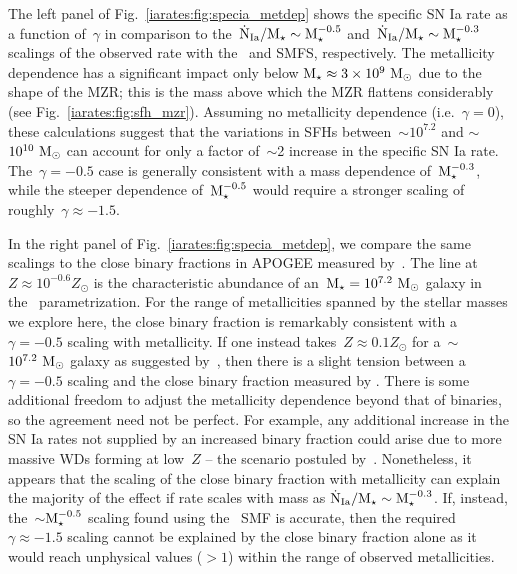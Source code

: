 The left panel of Fig.~\ref{iarates:fig:specia_metdep} shows the specific SN Ia rate
as a function of~$\gamma$ in comparison to the~$\dot{\text{N}}_\text{Ia} /
\text{M}_\star \sim \text{M}_\star^{-0.5}$ and~$\dot{\text{N}}_\text{Ia} / \text{M}_\star \sim
\text{M}_\star^{-0.3}$ scalings of the observed rate with the~\citet{Bell2003} and
\citet{Baldry2012} SMFS, respectively.
The metallicity dependence has a significant impact only below
$\text{M}_\star \approx 3\times10^9~\text{M}_\odot$ due to the shape of the MZR;
this is the mass above which the MZR flattens considerably (see
Fig.~\ref{iarates:fig:sfh_mzr}).
Assuming no metallicity dependence (i.e.~$\gamma = 0$), these calculations
suggest that the variations in SFHs between~$\sim$$10^{7.2}$ and
$\sim$$10^{10}~\text{M}_\odot$ can account for only a factor of~$\sim$2 increase in the
specific SN Ia rate.
The~$\gamma = -0.5$ case is generally consistent with a mass dependence
of~$\text{M}_\star^{-0.3}$, while the steeper dependence of~$\text{M}_\star^{-0.5}$ would
require a stronger scaling of roughly~$\gamma \approx -1.5$.
\par
In the right panel of Fig.~\ref{iarates:fig:specia_metdep}, we compare the same
scalings to the close binary fractions in APOGEE measured by~\citet{Moe2019}.
The line at~$Z \approx 10^{-0.6} Z_\odot$ is the characteristic abundance of
an~$\text{M}_\star = 10^{7.2}~\text{M}_\odot$ galaxy in the~\citet{Zahid2014} parametrization.
For the range of metallicities spanned by the stellar masses we explore here,
the close binary fraction is remarkably consistent with a~$\gamma = -0.5$
scaling with metallicity.
If one instead takes~$Z \approx 0.1Z_\odot$ for a~$\sim$$10^{7.2}~\text{M}_\odot$ galaxy
as suggested by~\citet{Andrews2013}, then there is a slight tension between a
$\gamma = -0.5$ scaling and the close binary fraction measured by
\citet{Moe2019}.
There is some additional freedom to adjust the metallicity dependence beyond
that of binaries, so the agreement need not be perfect.
For example, any additional increase in the SN Ia rates not supplied by an
increased binary fraction could arise due to more massive WDs forming at
low~$Z$ -- the scenario postuled by~\citet{Kistler2013}.
Nonetheless, it appears that the scaling of the close binary fraction with
metallicity can explain the majority of the effect if rate scales with mass as
$\dot{\text{N}}_\text{Ia} / \text{M}_\star \sim \text{M}_\star^{-0.3}$.
If, instead, the~$\sim$$\text{M}_\star^{-0.5}$ scaling found using the~\citet{Bell2003}
SMF is accurate, then the required~$\gamma \approx -1.5$ scaling cannot be
explained by the close binary fraction alone as it would reach unphysical
values ($>1$) within the range of observed metallicities.
